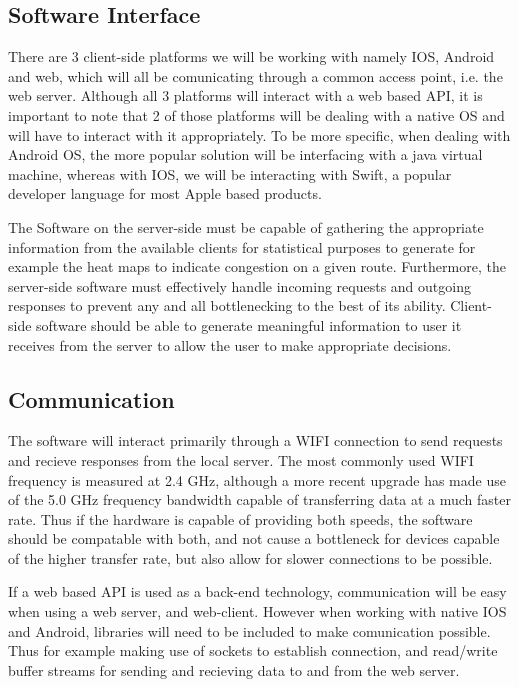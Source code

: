 \documentclass[11pt]{article}
\begin{document}
	\subsection{Software Interface}
	There are 3 client-side platforms we will be working with namely IOS, Android and web, which will all be comunicating through a common access point, i.e. the web server.  Although all 3 platforms will interact with a web based API, it is important to note that 2 of those platforms will be dealing with a native OS and will have to interact with it appropriately.  To be more specific, when dealing with Android OS, the more popular solution will be interfacing with a java virtual machine, whereas with IOS, we will be interacting with Swift, a popular developer language for most Apple based products.  
	
	The Software on the server-side must be capable of gathering the appropriate information from the available clients for statistical purposes to generate for example the heat maps to indicate congestion on a given route.  Furthermore, the server-side software must effectively handle incoming requests and outgoing responses to prevent any and all bottlenecking to the best of its ability.  Client-side software should be able to generate meaningful information to user it receives from the server to allow the user to make appropriate decisions.  
	\subsection{Communication}
	The software will interact primarily through a WIFI connection to send requests and recieve responses from the local server.  The most commonly used WIFI frequency is measured at 2.4 GHz, although a more recent upgrade has made use of the 5.0 GHz frequency bandwidth capable of transferring data at a much faster rate.  Thus if the hardware is capable of providing both speeds, the software should be compatable with both, and not cause a bottleneck for devices capable of the higher transfer rate, but also allow for slower connections to be possible.  
	
	If a web based API is used as a back-end technology, communication will be easy when using a web server, and web-client.  However when working with native IOS and Android, libraries will need to be included to make comunication possible.  Thus for example making use of sockets to establish connection, and read/write buffer streams for sending and recieving data to and from the web server.  
	
\end{document}
